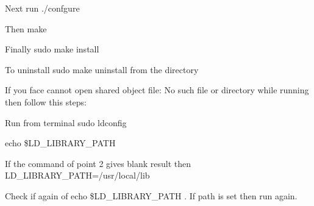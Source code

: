 \begin{DoxyEnumerate}
\item Next run {\ttfamily ./confgure}
\item Then {\ttfamily make}
\item Finally {\ttfamily sudo make install}
\end{DoxyEnumerate}
\begin{DoxyEnumerate}
\item To uninstall {\ttfamily sudo make uninstall} from the directory
\end{DoxyEnumerate}

If you face {\ttfamily cannot open shared object file\+: No such file or directory} while running then follow this steps\+:


\begin{DoxyEnumerate}
\item Run from terminal sudo ldconfig
\item echo \$\+L\+D\+\_\+\+L\+I\+B\+R\+A\+R\+Y\+\_\+\+P\+A\+TH
\item If the command of point 2 gives blank result then L\+D\+\_\+\+L\+I\+B\+R\+A\+R\+Y\+\_\+\+P\+A\+TH=/usr/local/lib
\item Check if again of {\ttfamily echo \$\+L\+D\+\_\+\+L\+I\+B\+R\+A\+R\+Y\+\_\+\+P\+A\+TH} . If path is set then run again. 
\end{DoxyEnumerate}